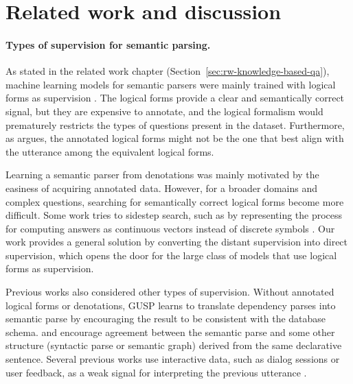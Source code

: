 \section{Related work and discussion}

\paragraph{Types of supervision for semantic parsing.}
As stated in the related work chapter 
(Section~\ref{sec:rw-knowledge-based-qa}),
machine learning models for semantic parsers
were mainly trained with logical forms as supervision
\cite{tang01ilp,wong07synchronous,zettlemoyer07relaxed,jia2016recombination,dong2016logical,zhong2017seq2sql}.
The logical forms provide a clear and semantically correct
signal, but they are expensive to annotate,
and the logical formalism would prematurely restricts the types
of questions present in the dataset.
Furthermore, as \citet{kushman2013regex} argues,
the annotated logical forms might not be the one
that best align with the utterance among
the equivalent logical forms.

Learning a semantic parser from denotations
\cite{clarke10world,liang11thesis,berant2013freebase}
was mainly motivated by the easiness of acquiring
annotated data.
However, for a broader domains and complex questions,
searching for semantically correct logical forms
become more difficult.
Some work tries to sidestep search,
such as by representing the process for computing answers
as continuous vectors instead of discrete symbols \cite{yin2016neural,neelakantan2016neural}.
Our work provides a general solution by converting
the distant supervision into direct supervision,
which opens the door for the large class of models that use
logical forms as supervision.

Previous works also considered other types
of supervision.
Without annotated logical forms or denotations,
GUSP \cite{poon2013gusp}
learns to translate dependency parses into semantic parse
by encouraging the result to be consistent with
the database schema.
\citet{krishnamurthy2012weakly} and
\citet{reddy2014large} encourage agreement
between the semantic parse and some other structure
(syntactic parse or semantic graph)
derived from the same declarative sentence.
Several previous works use interactive data,
such as dialog sessions or user feedback,
as a weak signal for interpreting the previous utterance
\cite{artzi11conversations,iyer2017neural,labutov2018learning}.

